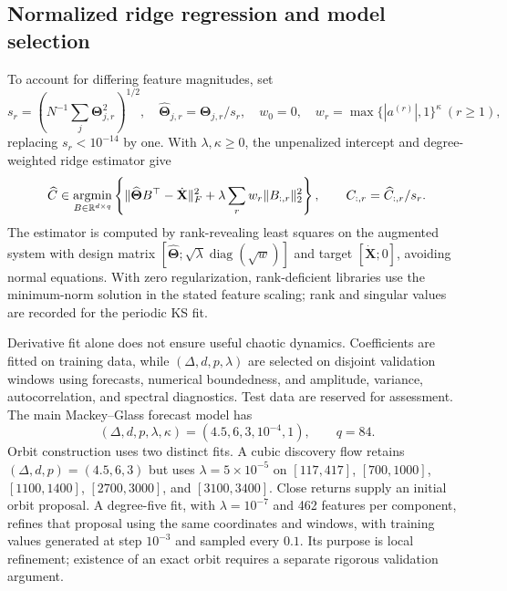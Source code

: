\documentclass[11pt]{article}
\newcommand{\R}{\mathbb{R}}
\newcommand{\Xdot}{\dot{\mathbf X}}
\newcommand{\Thetahat}{\widehat{\mathbf\Theta}}
\DeclareMathOperator{\diag}{diag}
\begin{document}
\subsection{Normalized ridge regression and model selection}
\label{sec:ridge-regression}
To account for differing feature magnitudes, set
\begin{equation}
 s_r=\left(N^{-1}\sum_j\mathbf\Theta_{j,r}^2\right)^{1/2},
 \quad \Thetahat_{j,r}=\mathbf\Theta_{j,r}/s_r,\quad
 w_0=0,\quad w_r=\max\{|a^{(r)}|,1\}^{\kappa}\ (r\geq1),
 \label{eq:feature-normalization}
\end{equation}
replacing $s_r<10^{-14}$ by one. With $\lambda,\kappa\geq0$, the unpenalized
intercept and degree-weighted ridge estimator \cite{hoerl1970} give
\begin{equation}
 \widehat C\in\mathop{\rm argmin}_{B\in\R^{d\times q}}
 \left\{\|\Thetahat B^\top-\Xdot\|_F^2+
 \lambda\sum_r w_r\|B_{:,r}\|_2^2\right\},\qquad
 C_{:,r}=\widehat C_{:,r}/s_r.
 \label{eq:ridge-objective}
\end{equation}
The estimator is computed by rank-revealing least squares on the augmented
system with design matrix $[\Thetahat;\sqrt{\lambda}\diag(\sqrt w)]$
and target $[\Xdot;0]$, avoiding normal equations. With zero regularization,
rank-deficient libraries use the minimum-norm solution in the stated feature
scaling; rank and singular values are recorded for the periodic KS fit.

Derivative fit alone does not ensure useful chaotic dynamics. Coefficients are
fitted on training data, while $(\Delta,d,p,\lambda)$ are selected on disjoint
validation windows using forecasts, numerical boundedness, and amplitude,
variance, autocorrelation, and spectral diagnostics. Test data are reserved for
assessment. The main Mackey--Glass forecast model has
\begin{equation}
 (\Delta,d,p,\lambda,\kappa)=(4.5,6,3,10^{-4},1),
 \qquad q=84.
 \label{eq:cubic-regression-parameters}
\end{equation}
Orbit construction uses two distinct fits. A cubic discovery flow retains
$(\Delta,d,p)=(4.5,6,3)$ but uses $\lambda=5\times10^{-5}$ on
$[117,417]$, $[700,1000]$, $[1100,1400]$, $[2700,3000]$, and $[3100,3400]$.
Close returns supply an initial orbit proposal. A degree-five fit, with
$\lambda=10^{-7}$ and 462 features per component, refines that proposal using the
same coordinates and windows, with training values generated at step $10^{-3}$
and sampled every $0.1$. Its purpose is local refinement; existence of an exact
orbit requires a separate rigorous validation argument.
\end{document}
